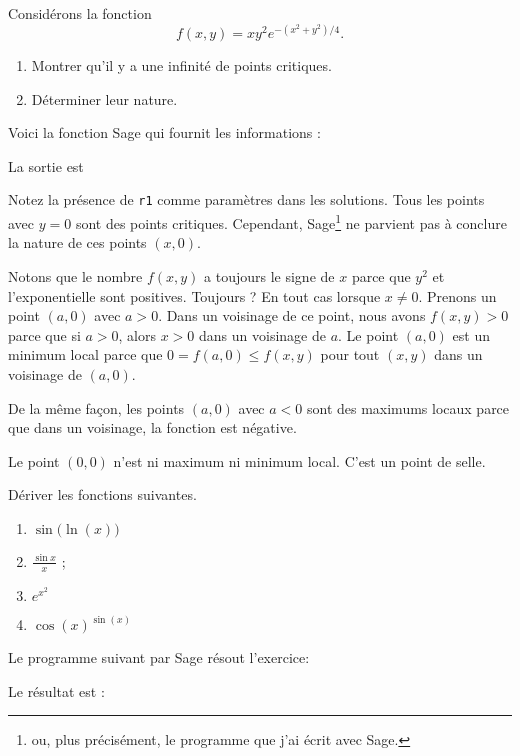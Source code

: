 \begin{example}     \label{exEEHPooKDxLTJ}


	Considérons la fonction
	\begin{equation}
		f(x,y)=xy^2 e^{-(x^2+y^2)/4}.
	\end{equation}
	\begin{enumerate}

		\item
		      Montrer qu'il y a une infinité de points critiques.
		\item
		      Déterminer leur nature.

	\end{enumerate}

	Voici la fonction Sage qui fournit les informations :

	

	La sortie est


	Notez la présence de \verb+r1+ comme paramètres dans les solutions. Tous les points avec \( y=0\) sont des points critiques. Cependant, Sage\footnote{ou, plus précisément, le programme que j'ai écrit avec Sage.} ne parvient pas à conclure la nature de ces points \( (x,0)\).

	Notons que le nombre \( f(x,y)\) a toujours le signe de \( x\) parce que \( y^2\) et l'exponentielle sont positives. Toujours ? En tout cas lorsque \( x\neq 0\). Prenons un point \( (a,0)\) avec \( a>0\). Dans un voisinage de ce point, nous avons \( f(x,y)>0\) parce que si \( a>0\), alors \( x>0\) dans un voisinage de \( a\). Le point \( (a,0)\) est un minimum local parce que \( 0=f(a,0)\leq f(x,y)\) pour tout \( (x,y)\) dans un voisinage de \( (a,0)\).

	De la même façon, les points \( (a,0)\) avec \( a<0\) sont des maximums locaux parce que dans un voisinage, la fonction est négative.

	Le point \( (0,0)\) n'est ni maximum ni minimum local. C'est un point de selle.

\end{example}

\begin{example}     \label{exRNZKooUIOfPU}

	Dériver les fonctions suivantes.
	\begin{enumerate}
		\item
		      \( \sin\big( \ln(x) \big)\)
		\item
		      \( \displaystyle \frac{\sin x}{x}\) ;
		\item
		      \(  e^{x^2}\)
		\item
		      \( \cos(x)^{\sin(x)}\)
	\end{enumerate}

	Le programme suivant par Sage résout l'exercice:
	

	Le résultat est :

\end{example}

